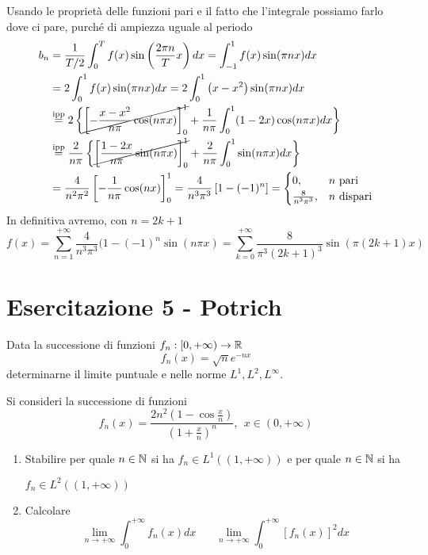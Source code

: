 Usando le proprietà delle funzioni pari e il fatto che l'integrale possiamo farlo dove ci pare, purché di ampiezza uguale al periodo
\begin{equation*}
\begin{aligned}
b_{n} & = \frac{1}{T/2}\int^{T}_{0} f(x)\sin\left(\frac{2\pi n}{T} x\right) dx = \int^{1}_{- 1} f(x)\sin(\pi nx) dx\\
 & = 2\int^{1}_{0} f(x)\sin(\pi nx) dx = 2\int^{1}_{0}\left(x - x^{2}\right)\sin(\pi nx) dx\\
 & \overset{\text{ipp}}{=} 2\left\{\cancel{\left[ - \frac{x - x^{2}}{n\pi}\cos(n\pi x)\right]^{1}_{0}} + \frac{1}{n\pi}\int^{1}_{0}(1 - 2x)\cos(n\pi x) dx\right\}\\
 & \overset{\text{ipp}}{=}\frac{2}{n\pi}\left\{\cancel{\left[\frac{1 - 2x}{n\pi}\sin(n\pi x)\right]^{1}_{0}} + \frac{2}{n\pi}\int^{1}_{0}\sin(n\pi x) dx\right\}\\
 & = \frac{4}{n^{2} \pi^{2}}\left[ - \frac{1}{n\pi}\cos (nx)\right]^{1}_{0} = \frac{4}{n^{3} \pi^{3}}\left[ 1 - (- 1)^{n}\right] =
\begin{cases}
0, & n\ \text{pari}\\
\frac{8}{n^{3} \pi^{3}}, & n\ \text{dispari}
\end{cases}
\end{aligned}
\end{equation*}
In definitiva avremo, con $n = 2k + 1$
\begin{equation*}
f(x) = \sum^{+ \infty}_{n = 1}\frac{4}{n^{3} \pi^{3}} (1 - (- 1)^{n}\sin (n\pi x) = \sum^{+ \infty}_{k = 0}\frac{8}{\pi^{3} (2k + 1)^{3}}\sin (\pi (2k + 1)x)
\end{equation*}
\chapter{Esercitazione 5 - Potrich}
\ParteEsercizi
\Esercizio{}

Data la successione di funzioni $f_{n} :[ 0, + \infty)\rightarrow \mathbb{R} $
\begin{equation*}
f_{n}(x) = \sqrt{n} e^{- nx}
\end{equation*}
determinarne il limite puntuale e nelle norme $L^{1}, L^{2}, L^{\infty}$.
\Esercizio{}

Si consideri la successione di funzioni
\begin{equation*}
f_{n} (x) = \frac{2n^{2}\left(1 - \cos\frac{x}{n}\right)}{\left(1 + \frac{x}{n}\right)^{n}}, \ \ x\in (0, + \infty)
\end{equation*}
\begin{enumerate}
\item Stabilire per quale $n\in \mathbb{N} $ si ha $f_{n} \in L^{1}((1, + \infty))$ e per quale $n\in \mathbb{N} $ si ha

$f_{n} \in L^{2}((1, + \infty))$
\item Calcolare
\begin{equation*}
\lim\limits_{n\rightarrow + \infty}\int^{+ \infty}_{0} f_{n}(x) dx\ \ \ \ \ \ \ \ \lim\limits_{n\rightarrow + \infty}\int^{+ \infty}_{0}[ f_{n}(x)]^{2} dx
\end{equation*}
\end{enumerate}
\Esercizio{}

